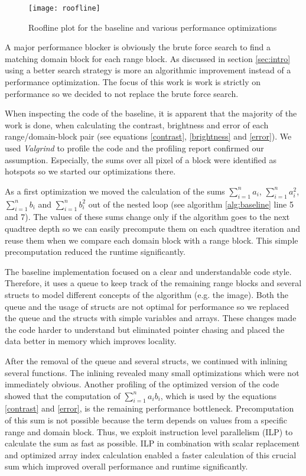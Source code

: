 \begin{figure}
  \texttt{[image: roofline]}
  \caption{Roofline plot for the baseline and various performance optimizations}
  \label{fig:roofline}
\end{figure}

 A major performance blocker is obviously the brute force search to find a matching domain
block for each range block. As discussed in section \ref{sec:intro} using a better search strategy is more
an algorithmic improvement instead of a performance optimization. The focus of this work is work is strictly
on performance so we decided to not replace the brute force search.

When inspecting the code of the baseline, it is apparent that the majority of the work
is done, when calculating the contrast, brightness and error of each range/domain-block pair 
(see equations \ref{contrast}, \ref{brightness} and \ref{error}). We used \textit{Valgrind} 
\cite{valgrind} to profile the code and the profiling report confirmed our assumption. Especially, the sums
over all pixel of a block were identified as hotspots so we started our optimizations there.

 As a first optimization we moved the calculation of the sums $\sum_{i=1}^n a_i$, 
$\sum_{i=1}^n a_i^2$, $\sum_{i=1}^n b_i$ and $\sum_{i=1}^n b_i^2$ out of the nested loop 
(see algorithm \ref{alg:baseline} line 5 and 7). The values of these sums change only if the algorithm goes
to the next quadtree depth so we can easily precompute them on each quadtree iteration and reuse them when we
compare each domain block with a range block. This simple precomputation reduced the runtime significantly.

The baseline implementation focused on a clear and understandable code style. Therefore, it uses a queue 
to keep track of the remaining range blocks and several structs to model different concepts of the algorithm 
(e.g. the image). Both the queue and the usage of structs are not optimal for performance so we replaced the
queue and the structs with simple variables and arrays. These changes made the code harder to understand
but eliminated pointer chasing and placed the data better in memory which improves locality.

After the removal of the queue and several structs, we continued with inlining several functions. The inlining
revealed many small optimizations which were not immediately obvious. Another profiling of the optimized
version of the code showed that the computation of $\sum_{i=1}^n a_i b_i$, which is used by the equations 
\ref{contrast} and \ref{error}, is the remaining performance bottleneck. Precomputation of this sum is not possible
because the term depends on values from a specific range and domain block. Thus, we exploit instruction level
parallelism (ILP) to calculate the sum as fast as possible. ILP in combination with scalar replacement and 
optimized array index calculation enabled a faster calculation of this crucial sum which improved overall
performance and runtime significantly.

